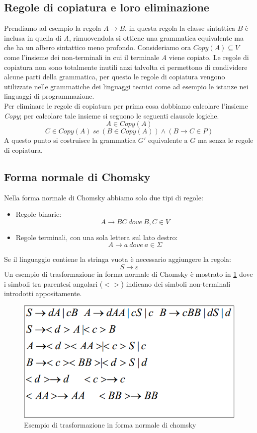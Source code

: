 \subsection{Regole di copiatura e loro eliminazione}
Prendiamo ad esempio la regola $A\rightarrow B$, in questa regola la classe sintattica $ B $ è inclusa in quella di \emph{A}, rimuovendola si ottiene una grammatica equivalente ma che ha un albero sintattico meno profondo.
Consideriamo ora $ Copy(A)\subseteq V $ come l'insieme dei non-terminali in cui il terminale \emph{A} viene copiato. Le regole di copiatura non sono totalmente inutili anzi talvolta ci permettono di condividere alcune parti della grammatica, per questo le regole di copiatura vengono utilizzate nelle grammatiche dei linguaggi tecnici come ad esempio le istanze nei linguaggi di programmazione.\\
Per eliminare le regole di copiatura per prima cosa dobbiamo calcolare l'insieme \emph{Copy}; per calcolare tale insieme si seguono le seguenti clausole logiche.
$$A \in Copy(A)$$
$$C \in Copy(A) \ se \ (B\in Copy(A))\wedge (B\rightarrow C \in P)$$
A questo punto si costruisce la grammatica $ G' $ equivalente a $ G $ ma senza le regole di copiatura.
\subsection{Forma normale di Chomsky}
Nella forma normale di Chomsky abbiamo solo due tipi di regole:
\begin{itemize}
	\item Regole binarie:
	$$A\rightarrow BC \ dove \ B,C \in V$$
	\item Regole terminali, con una sola lettera sul lato destro:
	$$A \rightarrow a \ dove \ a\in\Sigma$$
\end{itemize}
Se il linguaggio contiene la stringa vuota è  necessario aggiungere la regola:
$$S\rightarrow \varepsilon$$
Un esempio di trasformazione in forma normale di Chomsky è mostrato in \figurename \ref{fig:chomsky} dove i simboli tra parentesi angolari ($ < > $) indicano dei simboli non-terminali introdotti appositamente.
\begin{figure}
	\centering
	\includegraphics[width=0.5\linewidth]{img/chomsky.png}
	\caption{Esempio di trasformazione in forma normale di chomsky}\label{fig:chomsky}
\end{figure}
